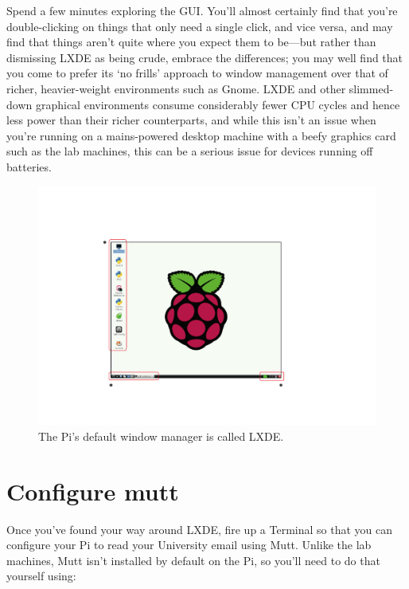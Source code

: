 Spend a few minutes exploring the GUI. You'll almost certainly find that you're double-clicking on things that only need a single click, and vice versa, and may find that things aren't quite where you expect them to be---but rather than dismissing LXDE as being crude, embrace the differences; you may well find that you come to prefer its `no frills' approach to window management over that of richer, heavier-weight environments such as Gnome. LXDE and other slimmed-down graphical environments consume considerably fewer CPU cycles and hence less power than their richer counterparts, and while this isn't an issue when you're running on a mains-powered desktop machine with a beefy graphics card such as the lab machines, this can be a serious issue for devices running off batteries. 

\begin{figure}
\centerline{\includegraphics[width=14cm]{images/lxde-desktop}}
\caption{The Pi's default window manager is called LXDE.}\label{figure:lxde-desktop}
\end{figure}

\section{Configure mutt}

Once you've found your way around LXDE, fire up a Terminal so that you can configure your Pi to read your University email using Mutt. Unlike the lab machines, Mutt isn't installed by default on the Pi, so you'll need to do that yourself using:


